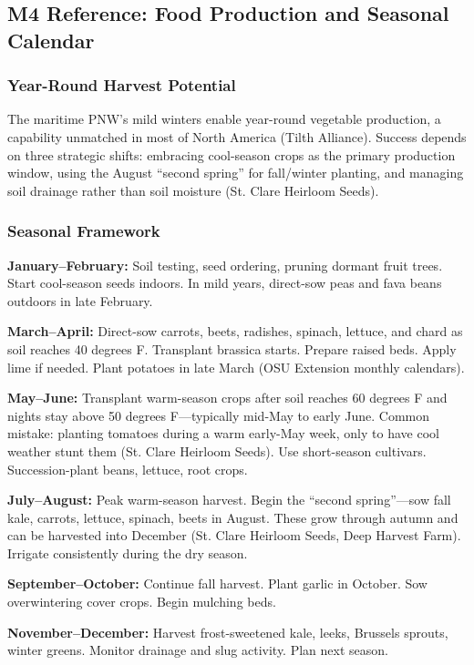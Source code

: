 \documentclass[11pt,letterpaper]{article}
\begin{document}
\subsection{M4 Reference: Food Production and Seasonal Calendar}

\subsubsection{Year-Round Harvest Potential}

The maritime PNW's mild winters enable year-round vegetable production, a capability unmatched in most of North America (Tilth Alliance). Success depends on three strategic shifts: embracing cool-season crops as the primary production window, using the August ``second spring'' for fall/winter planting, and managing soil drainage rather than soil moisture (St. Clare Heirloom Seeds).

\subsubsection{Seasonal Framework}

\textbf{January--February:} Soil testing, seed ordering, pruning dormant fruit trees. Start cool-season seeds indoors. In mild years, direct-sow peas and fava beans outdoors in late February.

\textbf{March--April:} Direct-sow carrots, beets, radishes, spinach, lettuce, and chard as soil reaches 40 degrees F. Transplant brassica starts. Prepare raised beds. Apply lime if needed. Plant potatoes in late March (OSU Extension monthly calendars).

\textbf{May--June:} Transplant warm-season crops after soil reaches 60 degrees F and nights stay above 50 degrees F---typically mid-May to early June. Common mistake: planting tomatoes during a warm early-May week, only to have cool weather stunt them (St. Clare Heirloom Seeds). Use short-season cultivars. Succession-plant beans, lettuce, root crops.

\textbf{July--August:} Peak warm-season harvest. Begin the ``second spring''---sow fall kale, carrots, lettuce, spinach, beets in August. These grow through autumn and can be harvested into December (St. Clare Heirloom Seeds, Deep Harvest Farm). Irrigate consistently during the dry season.

\textbf{September--October:} Continue fall harvest. Plant garlic in October. Sow overwintering cover crops. Begin mulching beds.

\textbf{November--December:} Harvest frost-sweetened kale, leeks, Brussels sprouts, winter greens. Monitor drainage and slug activity. Plan next season.
\end{document}
